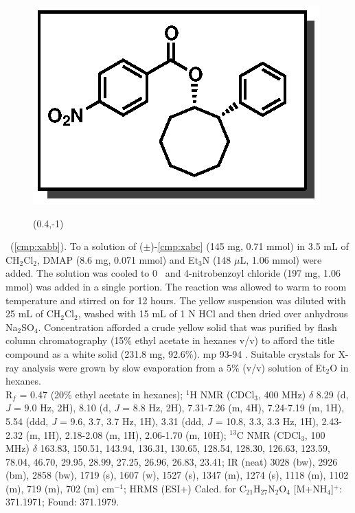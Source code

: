 \vspace{10pt}
\begin{figure}
  \vspace{-25pt}
  \begin{center}
    \includegraphics[scale=0.8]{chp_asymmetric/images/xabb}
        \begin{textblock}{1}(0.4,-1)  \end{textblock}
  \end{center}
  \vspace{-30pt}
\end{figure}\noindent \textbf{\CMPxabb}\ (\ref{cmp:xabb}). To a solution of
($\pm$)-\ref{cmp:xabc} (145 mg, 0.71 mmol) in
3.5 mL of CH$_2$Cl$_2$, DMAP (8.6 mg, 0.071 mmol) and Et$_3$N (148 $\mu$L, 1.06
mmol) were added. The solution was cooled to 0 \degc\ and 4-nitrobenzoyl
chloride (197 mg, 1.06 mmol) was added in a single portion. The reaction was
allowed to warm to room temperature and stirred on for 12 hours. The yellow
suspension was diluted with 25 mL of CH$_2$Cl$_2$, washed with 15 mL of 1 N HCl
and then dried over anhydrous Na$_2$SO$_4$. Concentration afforded a crude
yellow solid that was purified by flash column chromatography (15\% ethyl
acetate in hexanes v/v) to afford the title compound as a white solid (231.8 mg,
92.6\%). mp 93-94 \degc. Suitable crystals for X-ray analysis were grown by slow
evaporation from a 5\% (v/v) solution of Et$_2$O in hexanes.\\
R$_f$ = 0.47 (20\% ethyl acetate in hexanes); $^1$H NMR (CDCl$_3$, 400 MHz)
$\delta$ 8.29 (d, \textit{J} = 9.0 Hz, 2H), 8.10 (d, \textit{J} = 8.8 Hz, 2H),
7.31-7.26 (m, 4H), 7.24-7.19 (m, 1H), 5.54 (ddd, \textit{J} = 9.6, 3.7, 3.7 Hz,
1H), 3.31 (ddd, \textit{J} = 10.8, 3.3, 3.3 Hz, 1H), 2.43-2.32 (m, 1H),
2.18-2.08 (m, 1H), 2.06-1.70 (m, 10H); $^{13}$C NMR (CDCl$_3$, 100 MHz) $\delta$
163.83, 150.51, 143.94, 136.31, 130.65, 128.54, 128.30, 126.63, 123.59, 78.04,
46.70, 29.95, 28.99, 27.25, 26.96, 26.83, 23.41; IR (neat) 3028 (bw), 2926 (bm),
2858 (bw), 1719 (s), 1607 (w), 1527 (s), 1347 (m), 1274 (s), 1118 (m), 1102 (m),
719 (m), 702 (m) cm$^{-1}$; HRMS (ESI+) Calcd. for C$_{21}$H$_{27}$N$_{2}$O$_{4}$ [M+NH$_4$]$^+$: 371.1971; Found: 371.1979.

